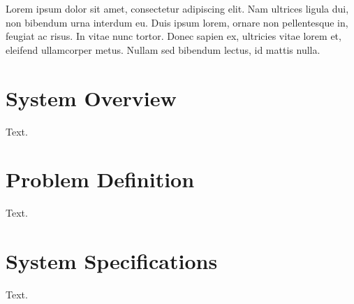 Lorem ipsum dolor sit amet, consectetur adipiscing elit. Nam ultrices ligula dui, non bibendum urna interdum eu. Duis ipsum lorem, ornare non pellentesque in, feugiat ac risus. In vitae nunc tortor. Donec sapien ex, ultricies vitae lorem et, eleifend ullamcorper metus. Nullam sed bibendum lectus, id mattis nulla.

\section{System Overview}
Text.

\section{Problem Definition}
Text.

\section{System Specifications}
Text.